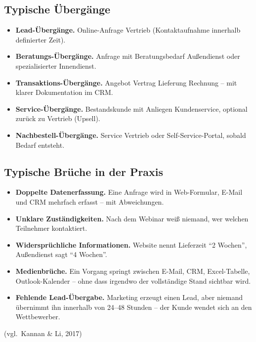 \documentclass[11pt,a4paper,oneside]{article}
\newcommand{\quelle}[1]{{\footnotesize\color{lpGray}(#1)}}
\begin{document}
\subsection{Typische Übergänge}

\begin{itemize}
  \item \textbf{Lead-Übergänge.} Online-Anfrage \textrightarrow{} Vertrieb (Kontaktaufnahme innerhalb definierter Zeit).
  \item \textbf{Beratungs-Übergänge.} Anfrage mit Beratungsbedarf \textrightarrow{} Außendienst oder spezialisierter Innendienst.
  \item \textbf{Transaktions-Übergänge.} Angebot \textrightarrow{} Vertrag \textrightarrow{} Lieferung \textrightarrow{} Rechnung -- mit klarer Dokumentation im CRM.
  \item \textbf{Service-Übergänge.} Bestandskunde mit Anliegen \textrightarrow{} Kundenservice, optional zurück zu Vertrieb (Upsell).
  \item \textbf{Nachbestell-Übergänge.} Service \textrightarrow{} Vertrieb oder Self-Service-Portal, sobald Bedarf entsteht.
\end{itemize}

\subsection{Typische Brüche in der Praxis}

\begin{itemize}
  \item \textbf{Doppelte Datenerfassung.} Eine Anfrage wird in Web-Formular, E-Mail und CRM mehrfach erfasst -- mit Abweichungen.
  \item \textbf{Unklare Zuständigkeiten.} Nach dem Webinar weiß niemand, wer welchen Teilnehmer kontaktiert.
  \item \textbf{Widersprüchliche Informationen.} Website nennt Lieferzeit ``2 Wochen'', Außendienst sagt ``4 Wochen''.
  \item \textbf{Medienbrüche.} Ein Vorgang springt zwischen E-Mail, CRM, Excel-Tabelle, Outlook-Kalender -- ohne dass irgendwo der vollständige Stand sichtbar wird.
  \item \textbf{Fehlende Lead-Übergabe.} Marketing erzeugt einen Lead, aber niemand übernimmt ihn innerhalb von 24--48 Stunden -- der Kunde wendet sich an den Wettbewerber.
\end{itemize}

\quelle{vgl.\ Kannan \& Li, 2017}
\end{document}

